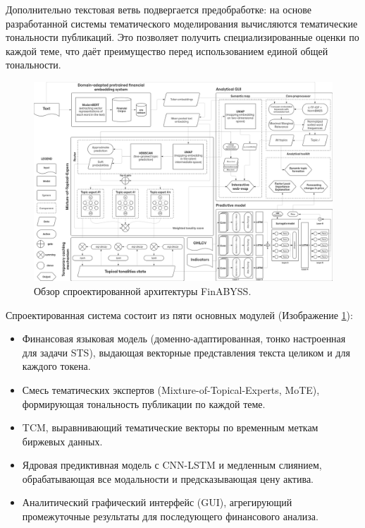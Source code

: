 Дополнительно текстовая ветвь подвергается предобработке: на основе разработанной системы тематического
моделирования вычисляются тематические тональности публикаций. Это позволяет получить специализированные
оценки по каждой теме, что даёт преимущество перед использованием единой общей тональности.


\begin{figure}[H]
    \centering
    \includegraphics[width=1\linewidth]{img/architecture_overview.png}
    \caption{Обзор спроектированной архитектуры FinABYSS.}
    \label{fig:architecture_overview}
\end{figure}

Спроектированная система состоит из пяти основных модулей (Изображение \ref{fig:architecture_overview}):

\begin{itemize}
    \item Финансовая языковая модель (доменно-адаптированная, тонко настроенная для задачи STS), выдающая векторные представления текста целиком и для каждого токена.
    \item Смесь тематических экспертов (Mixture-of-Topical-Experts, MoTE), формирующая тональность публикации по каждой теме.
    \item TCM, выравнивающий тематические векторы по временным меткам биржевых данных.
    \item Ядровая предиктивная модель с CNN-LSTM и медленным слиянием, обрабатывающая все модальности и предсказывающая цену актива.
    \item Аналитический графический интерфейс (GUI), агрегирующий промежуточные результаты для последующего финансового анализа.
\end{itemize}

